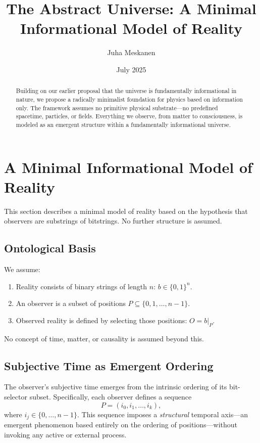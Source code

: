 \documentclass[11pt]{article}
\title{The Abstract Universe: A Minimal Informational Model of Reality}
\author{Juha Meskanen}
\date{July 2025}
\begin{document}
\maketitle


\begin{abstract}
    Building on our earlier proposal that the universe is fundamentally informational in nature,
    we propose a radically minimalist foundation for physics based on information only.
    The framework assumes no primitive physical substrate—no predefined spacetime, particles, or fields.
    Everything we observe, from matter to consciousness, is modeled as an emergent structure within a fundamentally informational universe.
\end{abstract}

\section{A Minimal Informational Model of Reality}

This section describes a minimal model of reality based on the hypothesis that observers are substrings of bitstrings. No further structure is assumed.

\subsection{Ontological Basis}

We assume:

\begin{enumerate}
    \item Reality consists of binary strings of length $n$: $b \in \{0,1\}^n$.
    \item An observer is a subset of positions $P \subseteq \{0,1,\dots,n-1\}$.
    \item Observed reality is defined by selecting those positions: $O = b|_P$.
\end{enumerate}

No concept of time, matter, or causality is assumed beyond this.

\subsection{Subjective Time as Emergent Ordering}

The observer’s subjective time emerges from the intrinsic ordering of its bit-selector subset. Specifically, each observer defines a sequence
\[
    P = (i_0, i_1, \dots, i_k),
\]
where \(i_j \in \{0,\dots,n-1\}\). This sequence imposes a \emph{structural} temporal axis—an emergent phenomenon based entirely on the ordering of positions—without invoking any active or external process.
\end{document}
